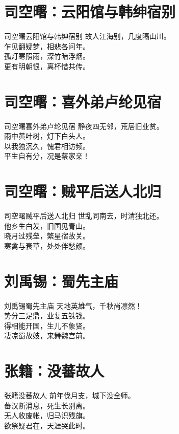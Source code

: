 \documentclass[12pt,oneside,a5paper]{book}
\begin{document}
\chapter{司空曙：云阳馆与韩绅宿别}
\begin{poemzh}{司空曙}{云阳馆与韩绅宿别}
故人江海别，几度隔山川。\\
乍见翻疑梦，相悲各问年。\\
孤灯寒照雨，深竹暗浮烟。\\
更有明朝恨，离杯惜共传。\\ 
\end{poemzh}

\chapter{司空曙：喜外弟卢纶见宿}
\begin{poemzh}{司空曙}{喜外弟卢纶见宿}
静夜四无邻，荒居旧业贫。\\
雨中黄叶树，灯下白头人。\\
以我独沉久，愧君相访频。\\
平生自有分，况是蔡家亲！\\ 
\end{poemzh}

\chapter{司空曙：贼平后送人北归}
\begin{poemzh}{司空曙}{贼平后送人北归}
世乱同南去，时清独北还。\\
他乡生白发，旧国见青山。\\
晓月过残垒，繁星宿故关。\\
寒禽与衰草，处处伴愁颜。\\ 
\end{poemzh}

\chapter{刘禹锡：蜀先主庙}
\begin{poemzh}{刘禹锡}{蜀先主庙}
天地英雄气，千秋尚凛然！\\
势分三足鼎，业复五铢钱。\\
得相能开国，生儿不象贤。\\
凄凉蜀故妓，来舞魏宫前。\\ 
\end{poemzh}

\chapter{张籍：没蕃故人}
\begin{poemzh}{张籍}{没蕃故人}
前年伐月支，城下没全师。\\
蕃汉断消息，死生长别离。\\
无人收废帐，归马识残旗。\\
欲祭疑君在，天涯哭此时。\\ 
\end{poemzh}
\end{document}
